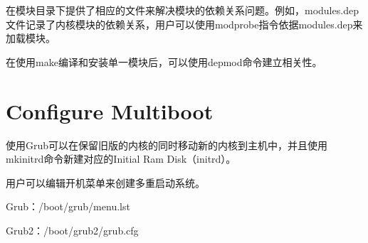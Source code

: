 在模块目录下提供了相应的文件来解决模块的依赖关系问题。例如，modules.dep文件记录了内核模块的依赖关系，用户可以使用modprobe指令依据modules.dep来加载模块。

在使用make编译和安装单一模块后，可以使用depmod命令建立相关性。


\section{Configure Multiboot}

使用Grub可以在保留旧版的内核的同时移动新的内核到主机中，并且使用mkinitrd命令新建对应的Initial Ram Disk（initrd）。

用户可以编辑开机菜单来创建多重启动系统。

\begin{compactitem}
\item Grub：/boot/grub/menu.lst
\item Grub2：/boot/grub2/grub.cfg
\end{compactitem}





































